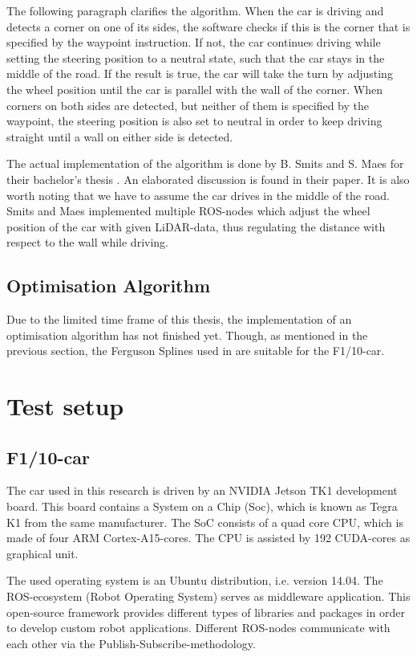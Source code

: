 \documentclass[conference,a4paper]{IEEEtran}
\begin{document}
The following paragraph clarifies the algorithm. When the car is driving and detects a corner on one of its sides, the software checks if this is the corner that is specified by the waypoint instruction. If not, the car continues driving while setting the steering position to a neutral state, such that the car stays in the middle of the road. If the result is true, the car will take the turn by adjusting the wheel position until the car is parallel with the wall of the corner. When corners on both sides are detected, but neither of them is specified by the waypoint, the steering position is also set to neutral in order to keep driving straight until a wall on either side is detected.

The actual implementation of the algorithm is done by B. Smits and S. Maes for their bachelor's thesis \cite{SmitsMaes2017}. An elaborated discussion is found in their paper. It is also worth noting that we have to assume the car drives in the middle of the road. Smits and Maes implemented multiple ROS-nodes which adjust the wheel position of the car with given LiDAR-data, thus regulating the distance with respect to the wall while driving. 

\subsection{Optimisation Algorithm}
\label{sec:OptAlgorithm}
Due to the limited time frame of this thesis, the implementation of an optimisation algorithm has not finished yet. Though, as mentioned in the previous section, the Ferguson Splines used in \cite{Saska2006} are suitable for the F1/10-car.

\section{Test setup}
\label{sec:TestSetup}
\subsection{F1/10-car}
The car used in this research is driven by an NVIDIA Jetson TK1 development board. This board contains a System on a Chip (Soc), which is known as Tegra K1 from the same manufacturer. The SoC consists of a quad core CPU, which is made of four ARM Cortex-A15-cores. The CPU is assisted by 192 CUDA-cores as graphical unit.

The used operating system is an Ubuntu distribution, i.e. version 14.04. The ROS-ecosystem (Robot Operating System) serves as middleware application. This open-source framework provides different types of libraries and packages in order to develop custom robot applications. Different ROS-nodes communicate with each other via the Publish-Subscribe-methodology.
\end{document}
